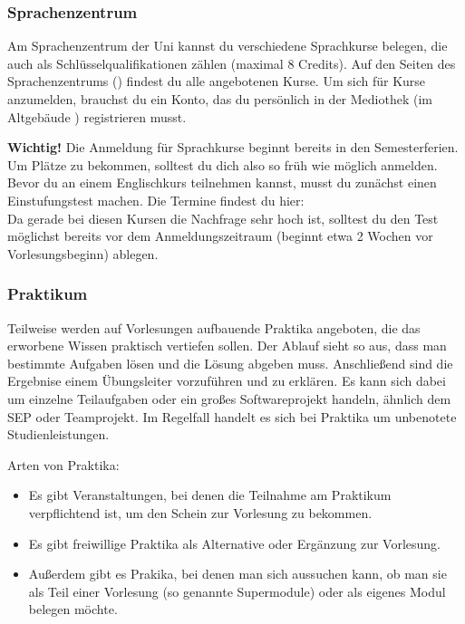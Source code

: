 	\subsubsection{Sprachenzentrum}
	Am Sprachenzentrum der Uni kannst du verschiedene Sprachkurse belegen, die auch als Schlüsselqualifikationen zählen (maximal 8 Credits). Auf den Seiten des Sprachenzentrums () findest du alle angebotenen Kurse. Um sich für Kurse anzumelden, brauchst du ein Konto, das du persönlich in der Mediothek (im Altgebäude ) registrieren musst.

	\textbf{Wichtig!} Die Anmeldung für Sprachkurse beginnt bereits in den Semesterferien. Um Plätze zu bekommen, solltest du dich also so früh wie möglich anmelden. Bevor du an einem Englischkurs teilnehmen kannst, musst du zunächst einen Einstufungstest machen. Die Termine findest du hier: \\ 
	Da gerade bei diesen Kursen die Nachfrage sehr hoch ist, solltest du den Test möglichst bereits vor dem Anmeldungszeitraum (beginnt etwa 2 Wochen vor Vorlesungsbeginn) ablegen.

	\subsubsection{Praktikum}
	Teilweise werden auf Vorlesungen aufbauende Praktika angeboten, die das erworbene Wissen praktisch vertiefen sollen. Der Ablauf sieht so aus, dass man bestimmte Aufgaben lösen und die Lösung abgeben muss. Anschließend sind die Ergebnise einem Übungsleiter vorzuführen und zu erklären. Es kann sich dabei um einzelne Teilaufgaben oder ein großes Softwareprojekt handeln, ähnlich dem SEP oder Teamprojekt. Im Regelfall handelt es sich bei Praktika um unbenotete Studienleistungen.

	Arten von Praktika:
	
	\begin{itemize}
		\item Es gibt Veranstaltungen, bei denen die Teilnahme am Praktikum verpflichtend ist, um den Schein zur Vorlesung zu bekommen. 
		\item Es gibt freiwillige Praktika als Alternative oder Ergänzung zur Vorlesung.
		\item Außerdem gibt es Prakika, bei denen man sich aussuchen kann, ob man sie als Teil einer Vorlesung (so genannte Supermodule) oder als eigenes Modul belegen möchte.
	\end{itemize}

